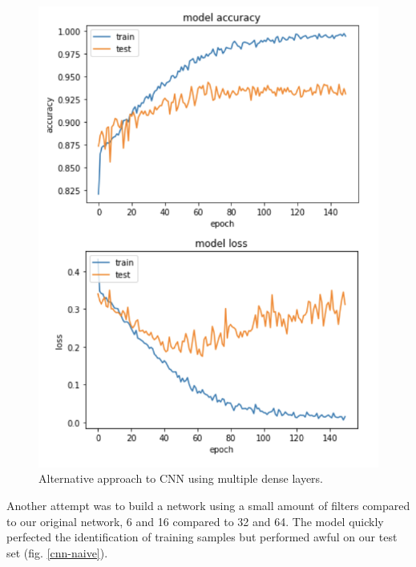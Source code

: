 \begin{figure}[ht]
\begin{center}
\centerline{\includegraphics[width=\columnwidth]{images/cnn-training-second.png}}
\caption{Alternative approach to CNN using multiple dense layers.}
\label{cnn-second}
\end{center}
\end{figure}

Another attempt was to build a network using a small amount of filters compared to our original network, 6 and 16 compared to 32 and 64. The model quickly perfected the identification of training samples but performed awful on our test set (fig. \ref{cnn-naive}).

